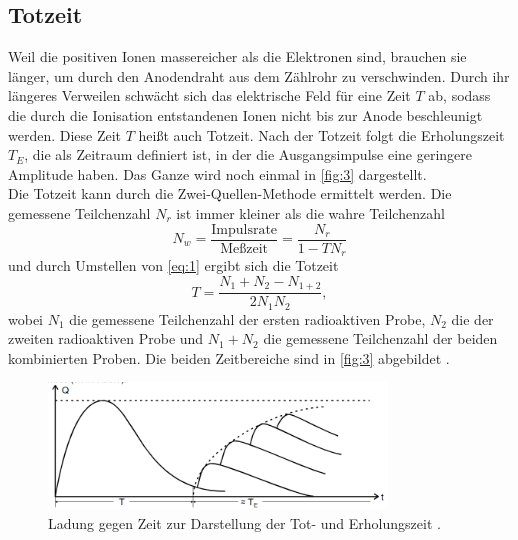 \subsection{Totzeit}
Weil die positiven Ionen massereicher als die Elektronen sind, brauchen sie länger, um durch den Anodendraht aus dem Zählrohr zu verschwinden. Durch ihr längeres Verweilen schwächt sich das elektrische Feld für eine Zeit $T$ ab, sodass die durch die Ionisation entstandenen Ionen nicht bis zur Anode beschleunigt werden. Diese Zeit $T$ heißt auch Totzeit. Nach der Totzeit folgt die Erholungszeit $T_E$, die als Zeitraum definiert ist, in der die Ausgangsimpulse eine geringere Amplitude haben. Das Ganze wird noch einmal in \autoref{fig:3} dargestellt.\\
Die Totzeit kann durch die Zwei-Quellen-Methode ermittelt werden. Die gemessene Teilchenzahl $N_r$ ist immer kleiner als die wahre Teilchenzahl
\begin{equation}
  N_w=\frac{\textrm{Impulsrate}}{\textrm{Meßzeit}}=\frac{N_r}{1-TN_r}
  \label{eq:1}
\end{equation}
und durch Umstellen von \eqref{eq:1} ergibt sich die Totzeit
\begin{equation}
  T=\frac{N_1+N_2-N_{1+2}}{2N_{1}N_{2}},
  \label{eq:2}
\end{equation}
wobei $N_1$ die gemessene Teilchenzahl der ersten radioaktiven Probe, $N_2$ die der zweiten radioaktiven Probe und $N_1 + N_2$ die gemessene Teilchenzahl der beiden kombinierten Proben.
Die beiden Zeitbereiche sind in \autoref{fig:3} abgebildet \cite{sample}.
\begin{figure}[H] 
  \centering 
  \includegraphics[width=9cm]{content/3.png} 
  \caption{Ladung gegen Zeit zur Darstellung der Tot- und Erholungszeit \cite{sample}.} 
  \label{fig:3} 
\end{figure}




